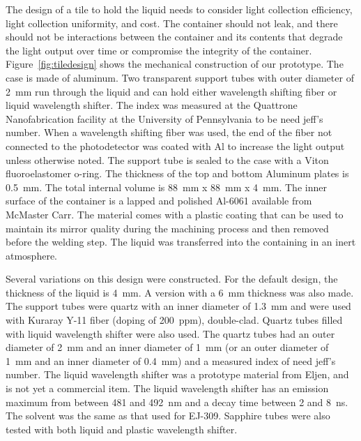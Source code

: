 \documentclass[review]{elsarticle}
\begin{document}
The design of a tile to hold the liquid needs to consider light
collection efficiency, light collection uniformity, and cost. The
container should not leak, and there should not be interactions
between the container and its contents that degrade the light output
over time or compromise the integrity of the
container. Figure~\ref{fig:tiledesign} shows the mechanical
construction of our prototype. The case is made of aluminum. Two
transparent support tubes with outer diameter of 2~mm run through the
liquid and can hold either wavelength shifting fiber or liquid
wavelength shifter. The index was measured at the Quattrone
Nanofabrication facility at the University of Pennsylvania to be
{\color{red} need jeff's number}. When a wavelength shifting fiber was
used, the end of the fiber not connected to the photodetector was
coated with Al to increase the light output unless otherwise
noted. The support tube is sealed to the case with a Viton
fluoroelastomer o-ring. The thickness of the top and bottom Aluminum
plates is 0.5~mm. The total internal volume is 88~mm x 88~mm x
4~mm. The inner surface of the container is a lapped and polished
Al-6061 available from McMaster Carr. The material comes with a
plastic coating that can be used to maintain its mirror quality during
the machining process and then removed before the welding step. The
liquid was transferred into the containing in an inert atmosphere.

Several variations on this design were constructed. For the default
design, the thickness of the liquid is 4~mm. A version with a 6~mm
thickness was also made. The support tubes were quartz with an inner
diameter of 1.3~mm and were used with Kuraray Y-11 fiber (doping of
200~ppm), double-clad. Quartz tubes filled with liquid wavelength
shifter were also used. The quartz tubes had an outer diameter of 2~mm
and an inner diameter of 1~mm (or an outer diameter of 1~mm and an
inner diameter of 0.4~mm) and a measured index of {\color{red} need
  jeff's number}. The liquid wavelength shifter was a prototype
material from Eljen, and is not yet a commercial item. The liquid
wavelength shifter has an emission maximum from between 481 and 492~nm
and a decay time between 2 and 8~ns. The solvent was the same as that
used for EJ-309. Sapphire tubes were also tested with both liquid and
plastic wavelength shifter.
\end{document}
